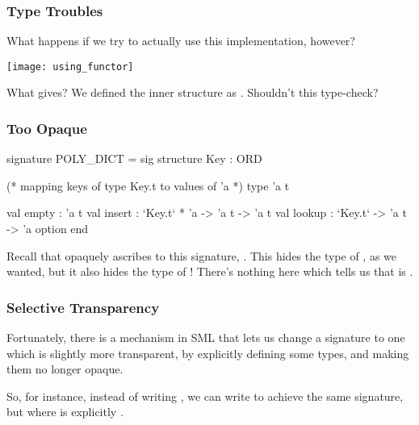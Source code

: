 \documentclass[aspectratio=169]{beamer}
\begin{document}
\begin{frame}[fragile]
  \frametitle{Type Troubles}

  What happens if we try to actually use this implementation, however?

  \pause
  \vspace{\fill}

  \begin{mdframed}[leftmargin=0.5cm, roundcorner=10pt, backgroundcolor=black!86!white, rightmargin=0.5cm]
  \begin{center}
  \texttt{[image: using\_functor]}
  \end{center}
  \end{mdframed}

  \pause
  \vspace{\fill}

  What gives? We defined the inner  structure as . Shouldn't
  this type-check?
\end{frame}

\begin{frame}[fragile]
  \frametitle{Too Opaque}
  {\small
  \begin{codeblock}
    signature POLY_DICT =
      sig
        structure Key : ORD

        (* mapping keys of type Key.t to values of 'a *)
        type 'a t

        val empty : 'a t
        val insert : `Key.t` * 'a -> 'a t -> 'a t
        val lookup : `Key.t` -> 'a t -> 'a option
      end
  \end{codeblock}
  }

  \pause
  \vspace{\fill}

  Recall that  opaquely ascribes to this signature, . This hides the
  type of , as we wanted, but it also hides the type of ! There's nothing
  here which tells us that  is .
\end{frame}

\begin{frame}[fragile]
  \frametitle{Selective Transparency}

  Fortunately, there is a mechanism in SML that lets us change a signature to one which
  is slightly more transparent, by explicitly defining some types, and making them no longer
  opaque.

  \pause
  \vspace{\fill}


  \pause
  \vspace{\fill}

  So, for instance, instead of writing , we can write 
  to achieve the same signature, but where  is explicitly .
\end{frame}
\end{document}
